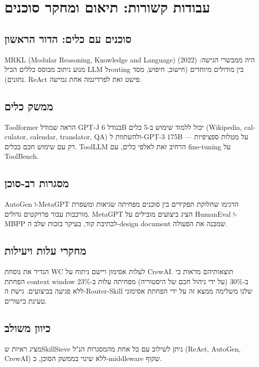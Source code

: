 
\clearpage
\chapter{עבודות קשורות: תיאום ומחקר סוכנים}

\section{סוכנים עם כלים: הדור הראשון}

\textenglish{MRKL} (\textenglish{Modular Reasoning, Knowledge and Language}) (2022) היה ממבשרי הגישה: מנוע ניתוב מבוסס כללים הכיל \textenglish{LLM} ל\textenglish{routing} בין מודולים מיוחדים (חישוב, חיפוש, מסד נתונים). \textenglish{ReAct} \cite{yao2022react} פישט זאת לפרדיגמה אחת גמישה.

\section{ממשק כלים}

\textenglish{Toolformer} \cite{schick2023toolformer} הראה שמודל \textenglish{GPT-J} בגודל \textenglish{6B} יכול ללמוד שימוש ב-5 כלים (\textenglish{Wikipedia, calculator, calendar, translator, QA}) ולהשתוות ל-\textenglish{GPT-3 175B} על מטלות ספציפיות --- רק עם שימוש חכם בכלים. \textenglish{ToolLLM} \cite{qin2023toolllm} הרחיב זאת לאלפי כלים, עם \textenglish{fine-tuning} על \textenglish{ToolBench}.

\section{מסגרות רב-סוכן}

\textenglish{AutoGen} \cite{wu2023autogen} ו-\textenglish{MetaGPT} \cite{hong2023metagpt} הדגימו שחלוקת תפקידים בין סוכנים מפחיתה שגיאות ומשפרת מורכבות עבור פרויקטים גדולים. \textenglish{MetaGPT} הציג ביצועים מובילים על \textenglish{HumanEval} ו-\textenglish{MBPP} לכתיבת קוד, בעיקר בזכות שלב ה-\textenglish{design document} שמבנה את הפעולה.

\section{מחקרי עלות ויעילות}

\cite{segal2024orchestration} הגדיר את נוסחת \textenglish{WC} לעלות אסימון ויישם ניתוח על \textenglish{CrewAI}. תוצאותיהם מראות כי הפחתת \textenglish{context window} ב-\textenglish{30\%} (על ידי ניהול חכם של היסטוריה) מפחיתה עלות ב-\textenglish{23\%} ללא פגיעה בביצועים. גישת ה-\textenglish{Router-Skill} שלנו משלימה ממצא זה על ידי הפחתת אסימוני טעינת כישורים.

\section{כיוון משולב}

\cite{nakash2024skillsieve} מציג ראיות ש\textenglish{SkillSieve} ניתן לשילוב עם כל אחת מהמסגרות הנ"ל (ReAct, AutoGen, CrewAI) ללא שינוי בממשק הסוכן, כ-\textenglish{middleware} שקוף.
